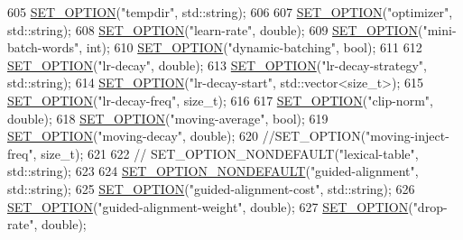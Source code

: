 \begin{DoxyCode}
605     \hyperlink{config__parser_8cpp_affc23be689aba6d401f64257177c293c}{SET\_OPTION}(\textcolor{stringliteral}{"tempdir"}, std::string);
606 
607     \hyperlink{config__parser_8cpp_affc23be689aba6d401f64257177c293c}{SET\_OPTION}(\textcolor{stringliteral}{"optimizer"}, std::string);
608     \hyperlink{config__parser_8cpp_affc23be689aba6d401f64257177c293c}{SET\_OPTION}(\textcolor{stringliteral}{"learn-rate"}, \textcolor{keywordtype}{double});
609     \hyperlink{config__parser_8cpp_affc23be689aba6d401f64257177c293c}{SET\_OPTION}(\textcolor{stringliteral}{"mini-batch-words"}, \textcolor{keywordtype}{int});
610     \hyperlink{config__parser_8cpp_affc23be689aba6d401f64257177c293c}{SET\_OPTION}(\textcolor{stringliteral}{"dynamic-batching"}, \textcolor{keywordtype}{bool});
611 
612     \hyperlink{config__parser_8cpp_affc23be689aba6d401f64257177c293c}{SET\_OPTION}(\textcolor{stringliteral}{"lr-decay"}, \textcolor{keywordtype}{double});
613     \hyperlink{config__parser_8cpp_affc23be689aba6d401f64257177c293c}{SET\_OPTION}(\textcolor{stringliteral}{"lr-decay-strategy"}, std::string);
614     \hyperlink{config__parser_8cpp_affc23be689aba6d401f64257177c293c}{SET\_OPTION}(\textcolor{stringliteral}{"lr-decay-start"}, std::vector<size\_t>);
615     \hyperlink{config__parser_8cpp_affc23be689aba6d401f64257177c293c}{SET\_OPTION}(\textcolor{stringliteral}{"lr-decay-freq"}, \textcolor{keywordtype}{size\_t});
616 
617     \hyperlink{config__parser_8cpp_affc23be689aba6d401f64257177c293c}{SET\_OPTION}(\textcolor{stringliteral}{"clip-norm"}, \textcolor{keywordtype}{double});
618     \hyperlink{config__parser_8cpp_affc23be689aba6d401f64257177c293c}{SET\_OPTION}(\textcolor{stringliteral}{"moving-average"}, \textcolor{keywordtype}{bool});
619     \hyperlink{config__parser_8cpp_affc23be689aba6d401f64257177c293c}{SET\_OPTION}(\textcolor{stringliteral}{"moving-decay"}, \textcolor{keywordtype}{double});
620     \textcolor{comment}{//SET\_OPTION("moving-inject-freq", size\_t);}
621 
622     \textcolor{comment}{// SET\_OPTION\_NONDEFAULT("lexical-table", std::string);}
623 
624     \hyperlink{config__parser_8cpp_a662e89992591378e43abcff938a17669}{SET\_OPTION\_NONDEFAULT}(\textcolor{stringliteral}{"guided-alignment"}, std::string);
625     \hyperlink{config__parser_8cpp_affc23be689aba6d401f64257177c293c}{SET\_OPTION}(\textcolor{stringliteral}{"guided-alignment-cost"}, std::string);
626     \hyperlink{config__parser_8cpp_affc23be689aba6d401f64257177c293c}{SET\_OPTION}(\textcolor{stringliteral}{"guided-alignment-weight"}, \textcolor{keywordtype}{double});
627     \hyperlink{config__parser_8cpp_affc23be689aba6d401f64257177c293c}{SET\_OPTION}(\textcolor{stringliteral}{"drop-rate"}, \textcolor{keywordtype}{double});

\end{DoxyCode}
